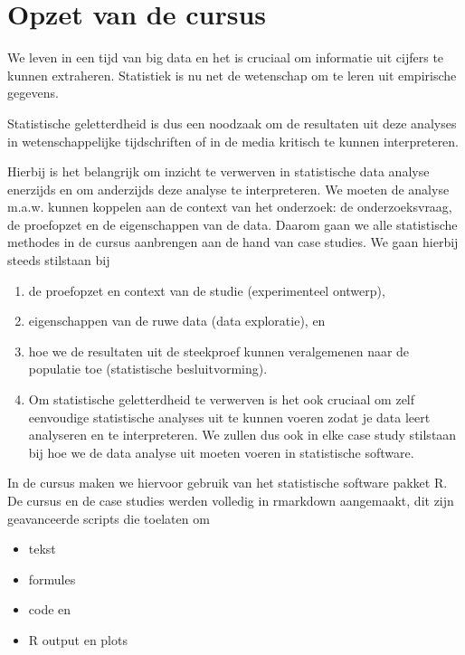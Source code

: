 \documentclass[
  12pt,dutch]{book}
\providecommand{\tightlist}{%
  \setlength{\itemsep}{0pt}\setlength{\parskip}{0pt}}
\theoremstyle{definition}
\theoremstyle{definition}
\theoremstyle{definition}
\theoremstyle{definition}
\theoremstyle{remark}
\begin{document}
\section{Opzet van de cursus}\label{opzet-van-de-cursus}

We leven in een tijd van big data en het is cruciaal om informatie uit cijfers te kunnen extraheren. Statistiek is nu net de wetenschap om te leren uit empirische gegevens.

Statistische geletterdheid is dus een noodzaak om de resultaten uit deze analyses in wetenschappelijke tijdschriften of in de media kritisch te kunnen interpreteren.

Hierbij is het belangrijk om inzicht te verwerven in statistische data analyse enerzijds en om anderzijds deze analyse te interpreteren. We moeten de analyse m.a.w. kunnen koppelen aan de context van het onderzoek: de onderzoeksvraag, de proefopzet en de eigenschappen van de data.
Daarom gaan we alle statistische methodes in de cursus aanbrengen aan de hand van case studies.
We gaan hierbij steeds stilstaan bij

\begin{enumerate}
\def\labelenumi{\arabic{enumi}.}
\item
  de proefopzet en context van de studie (experimenteel ontwerp),
\item
  eigenschappen van de ruwe data (data exploratie), en
\item
  hoe we de resultaten uit de steekproef kunnen veralgemenen naar de populatie toe (statistische besluitvorming).
\item
  Om statistische geletterdheid te verwerven is het ook cruciaal om zelf eenvoudige statistische analyses uit te kunnen voeren zodat je data leert analyseren en te interpreteren. We zullen dus ook in elke case study stilstaan bij hoe we de data analyse uit moeten voeren in statistische software.
\end{enumerate}

In de cursus maken we hiervoor gebruik van
het statistische software pakket R. De cursus en de case studies werden volledig in rmarkdown aangemaakt, dit zijn geavanceerde scripts die toelaten om

\begin{itemize}
\tightlist
\item
  tekst
\item
  formules
\item
  code en
\item
  R output en plots
\end{itemize}
\end{document}
